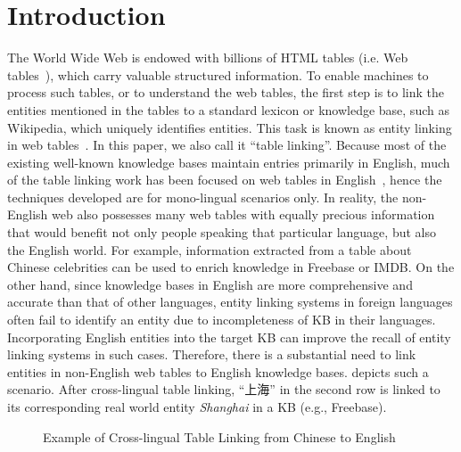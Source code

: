 \section{Introduction}
\label{sec:intro}

The World Wide Web is endowed with billions of HTML tables
(i.e. Web tables~\cite{cafarella2008webtables,wang2012understanding}), which carry
valuable structured information. To enable machines to process such tables, or to understand
the web tables, the first step is to link the entities mentioned in the 
tables to a standard lexicon or knowledge base, such as Wikipedia, which 
uniquely identifies entities. This task is
known as entity linking in web tables~\cite{bhagavatula2015tabel,wu2016entity}.
In this paper, we also call it ``table linking''. Because most of the existing
well-known knowledge bases maintain entries primarily in English, much of the table linking
work has been focused on web tables in English~\cite{bhagavatula2015tabel,limaye2010annotating},
hence the techniques developed are for mono-lingual scenarios only.
In reality, the non-English web also possesses many web tables with equally precious information
that would benefit not only people speaking that particular language,
but also the English world.
For example, information extracted from a table about Chinese celebrities can be
used to enrich knowledge in Freebase or IMDB.
On the other hand, since knowledge bases in English are more
comprehensive and accurate than that of other languages,
entity linking systems in foreign languages often fail to identify 
an entity due to incompleteness of KB in their languages.
Incorporating English entities into the target KB can improve 
the recall of entity linking systems in such cases.
Therefore, there is a substantial need to link entities in 
non-English web tables
to English knowledge bases.  depicts such a scenario. 
After cross-lingual table linking, ``上海'' in the second row is linked to its 
corresponding real world entity \textit{Shanghai} in a KB (e.g., Freebase).

\begin{figure}[th]
\centering
{}
\caption{Example of Cross-lingual Table Linking from Chinese to English}
\label{fig:chinesetable}
\end{figure}

